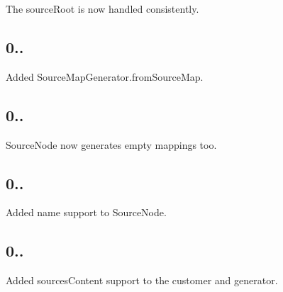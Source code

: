 \begin{DoxyItemize}
\item The source\+Root is now handled consistently.
\end{DoxyItemize}

\subsection*{0..}


\begin{DoxyItemize}
\item Added Source\+Map\+Generator.\+from\+Source\+Map.
\end{DoxyItemize}

\subsection*{0..}


\begin{DoxyItemize}
\item Source\+Node now generates empty mappings too.
\end{DoxyItemize}

\subsection*{0..}


\begin{DoxyItemize}
\item Added name support to Source\+Node.
\end{DoxyItemize}

\subsection*{0..}


\begin{DoxyItemize}
\item Added sources\+Content support to the customer and generator. 
\end{DoxyItemize}